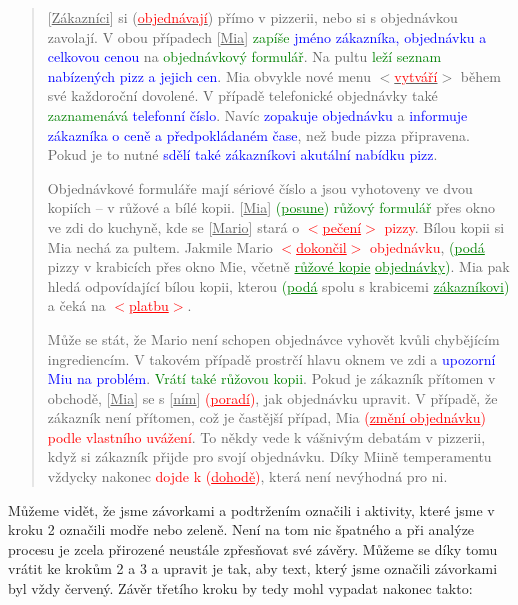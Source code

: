 \documentclass[]{article}
\begin{document}
\begin{quote}
[\underline{Zákazníci}] si (\underline{\textcolor{red}{objednávají}}) přímo v pizzerii, nebo si s objednávkou zavolají. V obou případech [\underline{Mia}] \textcolor{green}{zapíše} \textcolor{blue}{jméno zákazníka, objednávku a celkovou cenou} na \textcolor{green}{objednávkový formulář}. Na pultu \textcolor{green}{leží seznam} \textcolor{blue}{nabízených pizz a jejich cen}. Mia obvykle nové menu $<$\underline{\textcolor{red}{vytváří}}$>$ během své každoroční dovolené. V případě telefonické objednávky také \textcolor{green}{zaznamenává} \textcolor{blue}{telefonní číslo}. Navíc \textcolor{blue}{zopakuje objednávku} a \textcolor{blue}{informuje zákazníka o ceně a předpokládaném čase}, než bude pizza připravena. Pokud je to nutné \textcolor{blue}{sdělí také zákazníkovi akutální nabídku pizz}. 

Objednávkové formuláře mají sériové číslo a jsou vyhotoveny ve dvou kopiích – v růžové a bílé kopii. [\underline{Mia}] \textcolor{green}{(\underline{posune}) růžový formulář} přes okno ve zdi do kuchyně, kde se [\underline{Mario}] stará o \textcolor{red}{$<$\underline{pečení}$>$ pizzy}. Bílou kopii si Mia nechá za pultem. Jakmile Mario \textcolor{red}{$<$\underline{dokončil}$>$ objednávku}, \textcolor{green}{(\underline{podá}} pizzy v krabicích přes okno Mie, včetně \textcolor{green}{\underline{růžové kopie} \underline{objednávky})}. Mia pak hledá odpovídající bílou kopii, kterou \textcolor{green}{(\underline{podá}} spolu s krabicemi \textcolor{green}{\underline{zákazníkovi})} a čeká na \textcolor{red}{$<$\underline{platbu}$>$}. 

Může se stát, že Mario není schopen objednávce vyhovět kvůli chybějícím ingrediencím. V takovém případě prostrčí hlavu oknem ve zdi a \textcolor{blue}{upozorní Miu na problém}. \textcolor{green}{Vrátí také růžovou kopii}. Pokud je zákazník přítomen v obchodě, [\underline{Mia}] se s [\underline{ním}] \textcolor{red}{(\underline{poradí})}, jak objednávku upravit. V případě, že zákazník není přítomen, což je častější případ, Mia \textcolor{red}{(\underline{změní objednávku}) podle vlastního uvážení}. To někdy vede k vášnivým debatám v pizzerii, když si zákazník přijde pro svojí objednávku. Díky Miině temperamentu vždycky nakonec \textcolor{red}{dojde k (\underline{dohodě})}, která není nevýhodná pro ni.
\end{quote}

Můžeme vidět, že jsme závorkami a podtržením označili i aktivity, které jsme v kroku 2 označili modře nebo zeleně. Není na tom nic špatného a při analýze procesu je zcela přirozené neustále zpřesňovat své závěry. Můžeme se díky tomu vrátit ke krokům 2 a 3 a upravit je tak, aby text, který jsme označili závorkami byl vždy červený. Závěr třetího kroku by tedy mohl vypadat nakonec takto:
\end{document}
